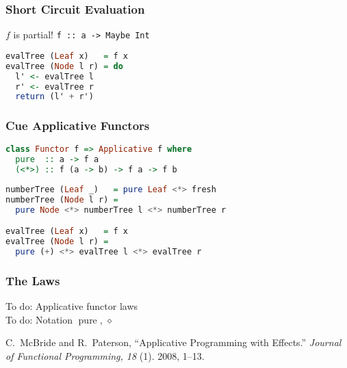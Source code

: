 \documentclass{beamer}
\newenvironment{reference}{\begingroup\scriptsize}{\endgroup}
\DeclareMathOperator{\pure}{pure}
\newcommand{\ap}{\diamond}
\begin{document}
\begin{frame}[fragile]
\frametitle{Short Circuit Evaluation}

\begin{center}\end{center}
$f$ is partial! \hspace{5mm} \lstinline{f :: a -> Maybe Int}

\begin{lstlisting}[language=Haskell]
evalTree (Leaf x)   = f x
evalTree (Node l r) = do
  l' <- evalTree l
  r' <- evalTree r
  return (l' + r')
\end{lstlisting}
\end{frame}

\begin{frame}[fragile]
\frametitle{Cue Applicative Functors}

\begin{lstlisting}[language=Haskell]
class Functor f => Applicative f where
  pure  :: a -> f a
  (<*>) :: f (a -> b) -> f a -> f b
\end{lstlisting}

\begin{lstlisting}[language=Haskell]
numberTree (Leaf _)   = pure Leaf <*> fresh
numberTree (Node l r) =
  pure Node <*> numberTree l <*> numberTree r

evalTree (Leaf x)   = f x
evalTree (Node l r) =
  pure (+) <*> evalTree l <*> evalTree r
\end{lstlisting}
\end{frame}

\begin{frame}
\frametitle{The Laws}
To do: Applicative functor laws \\
To do: Notation $\pure$, $\ap$

\vspace{\fill}
\begin{reference}
C.\ McBride and R.\ Paterson, ``Applicative Programming with Effects.''
\emph{Journal of Functional Programming, 18} (1). 2008, 1--13.
\end{reference}
\end{frame}
\end{document}
